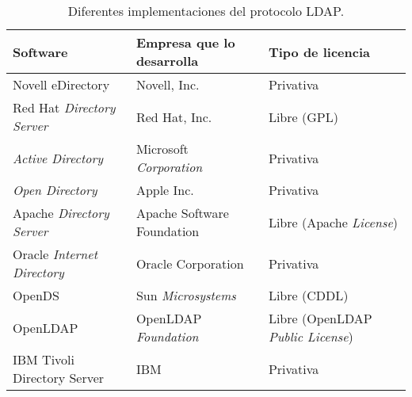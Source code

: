 \begin{table}[H]
	\centering
	\begin{tabular}{ |p{4cm}|p{4cm}|p{4cm}| }
		\hline
		\textbf{Software}&\textbf{Empresa que lo desarrolla}&\textbf{Tipo de licencia}\\
		\hline
		Novell eDirectory  &  Novell, Inc.  & Privativa\\
		\hline
		Red Hat \textit{Directory Server}& Red Hat, Inc.&Libre (GPL)\\
		\hline
		\textit{Active Directory} &Microsoft \textit{Corporation}& Privativa\\
		\hline
		\textit{Open Directory}&Apple Inc.& Privativa\\
		\hline
		Apache \textit{Directory Server}&   Apache Software Foundation& Libre (Apache \textit{License})\\
		\hline
		Oracle \textit{Internet Directory}&Oracle Corporation& Privativa\\
		\hline
		OpenDS&Sun \textit{Microsystems}& Libre (CDDL)\\
		\hline
		OpenLDAP&OpenLDAP \textit{Foundation}& Libre (OpenLDAP \textit{Public License})\\
		\hline
		IBM Tivoli Directory Server&IBM& Privativa\\
		\hline
	\end{tabular}
	\caption{\label{tab:table-name}Diferentes implementaciones del protocolo LDAP.}
\end{table}